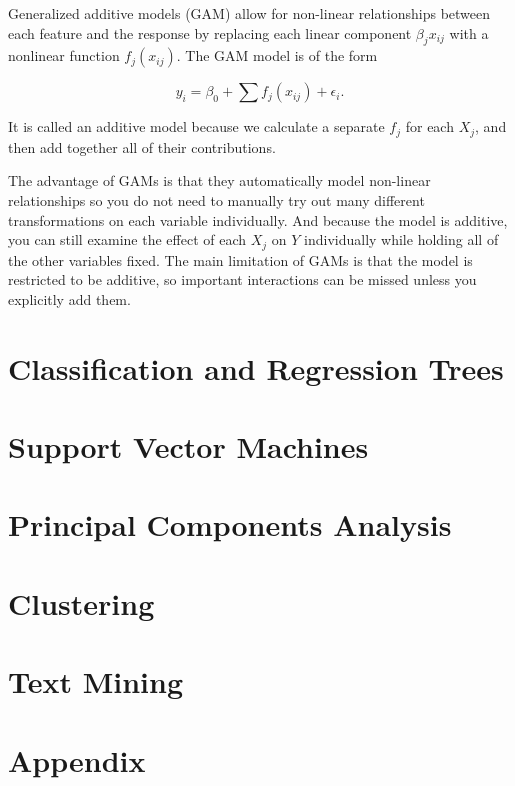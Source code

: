 \documentclass[]{book}
\begin{document}
Generalized additive models (GAM) allow for non-linear relationships between each feature and the response by replacing each linear component \(\beta_j x_{ij}\) with a nonlinear function \(f_j(x_{ij})\). The GAM model is of the form

\[y_i = \beta_0 + \sum{f_j(x_{ij})} + \epsilon_i.\]

It is called an additive model because we calculate a separate \(f_j\) for each \(X_j\), and then add together all of their contributions.

The advantage of GAMs is that they automatically model non-linear relationships so you do not need to manually try out many diﬀerent transformations on each variable individually. And because the model is additive, you can still examine the eﬀect of each \(X_j\) on \(Y\) individually while holding all of the other variables ﬁxed. The main limitation of GAMs is that the model is restricted to be additive, so important interactions can be missed unless you explicitly add them.

\hypertarget{classification-and-regression-trees}{%
\chapter{Classification and Regression Trees}\label{classification-and-regression-trees}}

\hypertarget{support-vector-machines}{%
\chapter{Support Vector Machines}\label{support-vector-machines}}

\hypertarget{principal-components-analysis}{%
\chapter{Principal Components Analysis}\label{principal-components-analysis}}

\hypertarget{clustering}{%
\chapter{Clustering}\label{clustering}}

\hypertarget{text-mining}{%
\chapter{Text Mining}\label{text-mining}}

\hypertarget{appendix}{%
\chapter*{Appendix}\label{appendix}}
\end{document}
